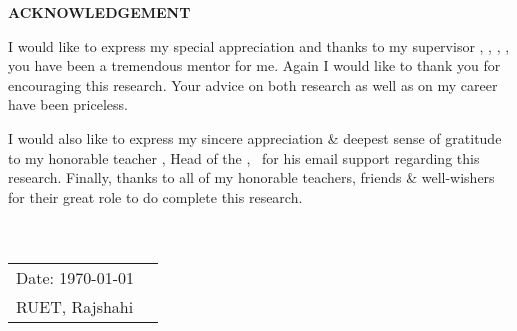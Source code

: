 \documentclass[document.tex]{subfiles}
\begin{document}

\begin{center}
\textbf{{\fontsize{16pt}{0.5cm}\selectfont ACKNOWLEDGEMENT}}
\vspace{1cm}
\end{center}

\noindent I would like to express my special appreciation and thanks to my supervisor \textbf{\thesissupervisor}, \thesissupervisordesignation, \deptT, \ruet, you have been a tremendous mentor for me. Again I would like to thank you for encouraging this research. Your advice on both research as well as on my career have been priceless. 

\noindent I would also like to express my sincere appreciation \& deepest sense of gratitude to my honorable teacher \textbf{\depthead}, Head of the \deptT, \ruet \, for his email support regarding this research.
\noindent Finally, thanks to all of my honorable teachers, friends \& well-wishers for their great role to do complete this research.
\\
\\\\
\noindent
\begin{tabularx}{\textwidth}{X X}
  {\fontsize{14pt}{0.5cm}\selectfont Date: \today} & \raggedleft { \fontsize{14pt}{0.5cm}\selectfont \authorname }\tabularnewline
{\fontsize{14pt}{0.5cm}\selectfont RUET, Rajshahi} & \tabularnewline
\end{tabularx}



\clearpage
\end{document}

